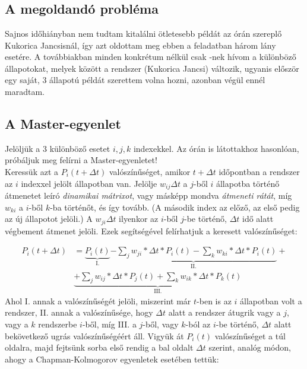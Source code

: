 \section{} \label{sec:2}

\subsection{A megoldandó probléma} \label{sub:2.1}
Sajnos időhiányban nem tudtam kitalálni ötletesebb példát az órán szereplő Kukorica Jancsisnál, így azt oldottam meg ebben a feladatban három lány esetére. A továbbiakban minden konkrétum nélkül csak -nek hívom a különböző állapotokat, melyek között a rendszer (Kukorica Jancsi) változik, ugyanis először egy saját, 3 állapotú példát szerettem volna hozni, azonban végül ennél maradtam.

\subsection{A Master-egyenlet} \label{sub:2.2}
Jelöljük a 3 különböző esetet $i,j,k$ indexekkel. Az órán is látottakhoz hasonlóan, próbáljuk meg felírni a Master-egyenletet! \\
Keressük azt a $P_{i} \left( t + \Delta t \right)$ valószínűséget, amikor $t + \Delta t$ időpontban a rendszer az $i$ indexxel jelölt állapotban van. Jelölje $w_{ij} \Delta t$ a $j$-ből $i$ állapotba történő átmenetet leíró \emph{dinamikai mátrixot}, vagy másképp mondva \emph{átmeneti rátát}, míg $w_{ki}$ a $i$-ből $k$-ba történőt, és így tovább. (A második index az előző, az első pedig az új állapotot jelöli.) A $w_{ji} \Delta t$ ilyenkor az $i$-ből $j$-be történő, $\Delta t$ idő alatt végbement átmenet jelöli. Ezek segítségével felírhatjuk a keresett valószínűséget:

\begin{align}
    P_{i} \left( t + \Delta t \right)
    &=
    \underbrace{
    P_{i} \left( t \right)}_{\text{I.}}
    \underbrace{
    -
    \sum_{j} w_{ji} * \Delta t * P_{i} \left( t \right)
    -
    \sum_{k} w_{ki} * \Delta t * P_{i} \left( t \right)
    }_{\text{II.}} + \nonumber \\
    &\underbrace{+
    \sum_{j} w_{ij} * \Delta t * P_{j} \left( t \right)
    +
    \sum_{k} w_{ik} * \Delta t * P_{k} \left( t \right)
    }_{\text{III.}}
\end{align}
Ahol I. annak a valószínűségét jelöli, miszerint már $t$-ben is az $i$ állapotban volt a rendszer, II. annak a valószínűsége, hogy $\Delta t$ alatt a rendszer átugrik vagy a $j$, vagy a $k$ rendszerbe $i$-ből, míg III. a $j$-ből, vagy $k$-ból az $i$-be történő, $\Delta t$ alatt bekövetkező ugrás valószínűségéért áll. Vigyük át $P_{i} \left( t \right)$ valószínűséget a túl oldalra, majd fejtsünk sorba első rendig a bal oldalt $\Delta t$ szerint, analóg módon, ahogy a Chapman-Kolmogorov egyenletek esetében tettük:

